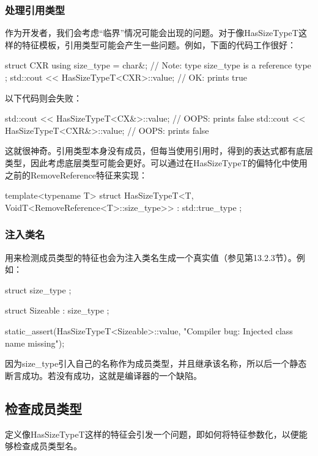 \subsubsection{处理引用类型}

作为开发者，我们会考虑“临界”情况可能会出现的问题。对于像HasSizeTypeT这样的特征模板，引用类型可能会产生一些问题。例如，下面的代码工作很好：

\begin{cpp}
struct CXR {
	using size_type = char&; // Note: type size_type is a reference type
};
std::cout << HasSizeTypeT<CXR>::value; // OK: prints true
\end{cpp}

以下代码则会失败：

\begin{cpp}
std::cout << HasSizeTypeT<CX&>::value; // OOPS: prints false
std::cout << HasSizeTypeT<CXR&>::value; // OOPS: prints false
\end{cpp}

这就很神奇。引用类型本身没有成员，但每当使用引用时，得到的表达式都有底层类型，因此考虑底层类型可能会更好。可以通过在HasSizeTypeT的偏特化中使用之前的RemoveReference特征来实现：

\begin{cpp}
template<typename T>
struct HasSizeTypeT<T, VoidT<RemoveReference<T>::size_type>>
: std::true_type {};
\end{cpp}

\subsubsection{注入类名}

用来检测成员类型的特征也会为注入类名生成一个真实值（参见第13.2.3节）。例如：

\begin{cpp}
struct size_type {};

struct Sizeable : size_type {};

static_assert(HasSizeTypeT<Sizeable>::value,
			"Compiler bug: Injected class name missing");
\end{cpp}

因为size\_type引入自己的名称作为成员类型，并且继承该名称，所以后一个静态断言成功。若没有成功，这就是编译器的一个缺陷。

\subsection{检查成员类型}

定义像HasSizeTypeT这样的特征会引发一个问题，即如何将特征参数化，以便能够检查成员类型名。

